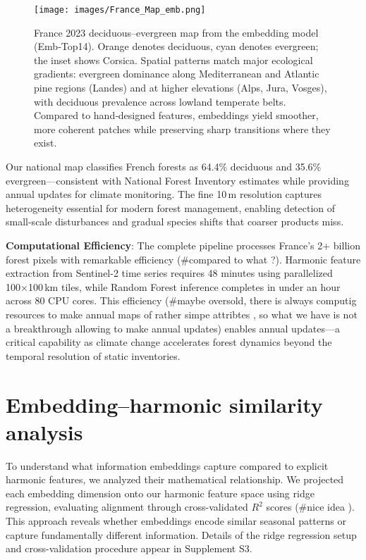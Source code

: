 \documentclass[utf8]{FrontiersinHarvard}
\begin{document}
\begin{figure}[H]
    \centering
    \texttt{[image: images/France\_Map\_emb.png]}
    \caption{France 2023 deciduous--evergreen map from the embedding model (Emb‑Top14). Orange denotes deciduous, cyan denotes evergreen; the inset shows Corsica. Spatial patterns match major ecological gradients: evergreen dominance along Mediterranean and Atlantic pine regions (Landes) and at higher elevations (Alps, Jura, Vosges), with deciduous prevalence across lowland temperate belts. Compared to hand‑designed features, embeddings yield smoother, more coherent patches while preserving sharp transitions where they exist.}
    \label{fig:national_map}
\end{figure}

Our national map classifies French forests as 64.4\% deciduous and 35.6\% evergreen—consistent with National Forest Inventory estimates while providing annual updates for climate monitoring. The fine 10\,m resolution captures heterogeneity essential for modern forest management, enabling detection of small-scale disturbances and gradual species shifts that coarser products miss.

\textbf{Computational Efficiency}: The complete pipeline processes France's 2+ billion forest pixels with remarkable efficiency (#compared to what ?). Harmonic feature extraction from Sentinel-2 time series requires 48 minutes using parallelized 100×100\,km tiles, while Random Forest inference completes in under an hour across 80 CPU cores. This efficiency (#maybe oversold, there is always computig resources to make annual maps of rather simpe attribtes , so what we have is not a breakthrough allowing to make annual updates) enables annual updates—a critical capability as climate change accelerates forest dynamics beyond the temporal resolution of static inventories.
\section{Embedding–harmonic similarity analysis} %

To understand what information embeddings capture compared to explicit harmonic features, we analyzed their mathematical relationship. We projected each embedding dimension onto our harmonic feature space using ridge regression, evaluating alignment through cross-validated $R^2$ scores (#nice idea ). This approach reveals whether embeddings encode similar seasonal patterns or capture fundamentally different information. Details of the ridge regression setup and cross-validation procedure appear in Supplement S3.
\end{document}

